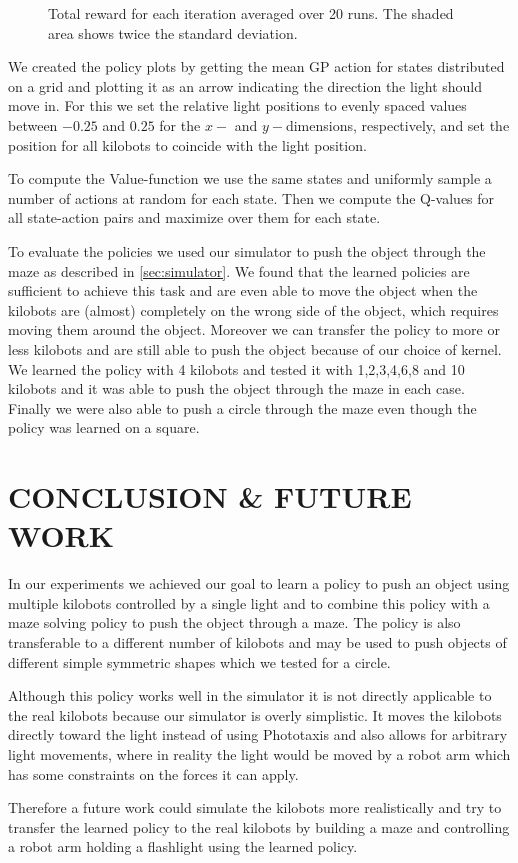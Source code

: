 \documentclass[twoside]{article}
\begin{document}
\begin{figure}[!htb]
    \centering
    \resizebox{\linewidth}{!}{}
    \caption{Total reward for each iteration averaged over 20 runs. The shaded
             area shows twice the standard deviation.}
    \label{fig:meanReward}
\end{figure}

We created the policy plots by getting the mean GP action for states distributed on a
grid and plotting it as an arrow indicating the direction the light should move
in. For this we set the relative light positions to evenly spaced values between
$-0.25$ and $0.25$ for the $x-$ and $y-$dimensions, respectively, and set the
position for all kilobots to coincide with the light position.

To compute the Value-function we use the same states and uniformly sample a
number of actions at random for each state. Then we compute the Q-values for all
state-action pairs and maximize over them for each state.

To evaluate the policies we used our simulator to push the object through the
maze as described in \ref{sec:simulator}. We found that the learned policies are
sufficient to achieve this task and are even able to move the object when the
kilobots are (almost) completely on the wrong side of the object, which requires
moving them around the object. Moreover we can transfer the policy to more or
less kilobots and are still able to push the object because of our choice of
kernel. We learned the policy with 4 kilobots and tested it with 1,2,3,4,6,8 and
10 kilobots and it was able to push the object through the maze in each case.
Finally we were also able to push a circle through the maze even though the
policy was learned on a square.

\section{CONCLUSION \& FUTURE WORK}

In our experiments we achieved our goal to learn a policy to push an object
using multiple kilobots controlled by a single light and to combine this policy
with a maze solving policy to push the object through a maze. The policy is also
transferable to a different number of kilobots and may be used to push objects of
different simple symmetric shapes which we tested for a circle.

Although this policy works well in the simulator it is not directly applicable
to the real kilobots because our simulator is overly simplistic. It moves
the kilobots directly toward the light instead of using Phototaxis and also
allows for arbitrary light movements, where in reality the light would be moved
by a robot arm which has some constraints on the forces it can apply.

Therefore a future work could simulate the kilobots more realistically and try
to transfer the learned policy to the real kilobots by building a maze and
controlling a robot arm holding a flashlight using the learned policy.



\end{document}

